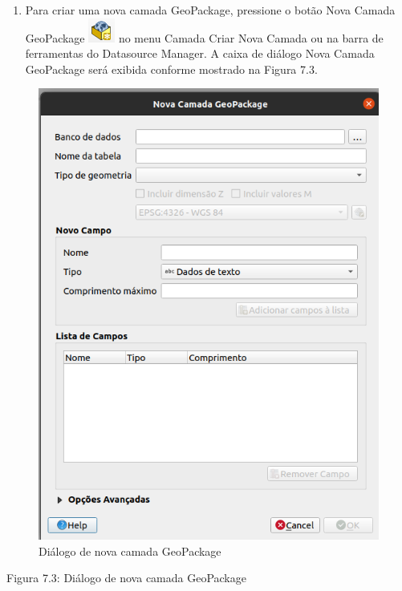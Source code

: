 \documentclass[
  portuguese,
]{krantz}
\providecommand{\tightlist}{%
  \setlength{\itemsep}{0pt}\setlength{\parskip}{0pt}}
\begin{document}
\begin{enumerate}
\def\labelenumi{\arabic{enumi}.}
\tightlist
\item
  Para criar uma nova camada GeoPackage, pressione o botão Nova Camada GeoPackage \includegraphics{media/modulo7/geopackage-button.png}
  no menu Camada Criar Nova Camada ou na barra de ferramentas do Datasource Manager. A caixa de diálogo Nova Camada GeoPackage será exibida conforme mostrado na Figura 7.3.
\end{enumerate}

\begin{figure}
\centering
\includegraphics{media/modulo7/new-geopackage-dialog.png}
\caption{Diálogo de nova camada GeoPackage}
\end{figure}

Figura 7.3: Diálogo de nova camada GeoPackage
\end{document}
